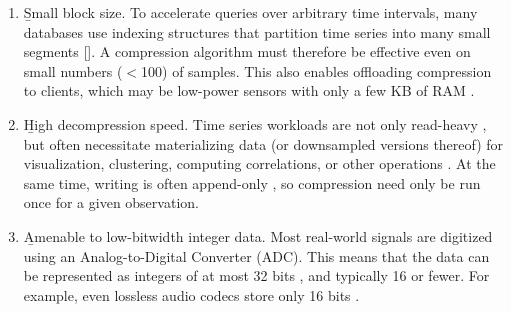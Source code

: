 \begin{enumerate}
\itemsep0mm
\item \b{Small block size}. To accelerate queries over arbitrary time intervals, many databases use indexing structures that partition time series into many small segments []. A compression algorithm must therefore be effective even on small numbers ($<$100) of samples. This also enables offloading compression to clients, which may be low-power sensors with only a few KB of RAM \cite{respawnDB}.
\item \b{High decompression speed}. Time series workloads are not only read-heavy \cite{respawnDB, berkeleyTreeDB, influxDB}, but often necessitate materializing data (or downsampled versions thereof) for visualization, clustering, computing correlations, or other operations \cite{respawnDB}. At the same time, writing is often append-only \cite{gorilla, respawnDB}, so compression need only be run once for a given observation.
\item \b{Amenable to low-bitwidth integer data}. Most real-world signals are digitized using an Analog-to-Digital Converter (ADC). This means that the data can be represented as integers of at most 32 bits \cite{digikeyADCs}, and typically 16 or fewer. For example, even lossless audio codecs store only 16 bits \cite{flac, shorten}. %

\end{enumerate}
